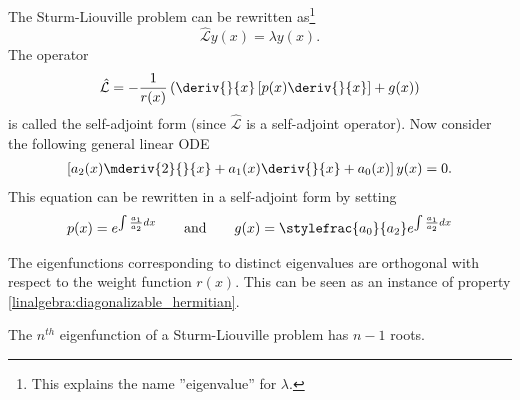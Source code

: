 	\begin{definition}
		The Sturm-Liouville problem can be rewritten as\footnote{This explains the name ''eigenvalue'' for $\lambda$.} \[\hat{\mathcal{L}}y(x) = \lambda y(x).\] The operator
		\begin{gather}
			\hat{\mathcal{L}} = -\frac{1}{r(x)}\left(\deriv{}{x}\left[p(x)\deriv{}{x}\right] + g(x)\right)
		\end{gather}
		is called the self-adjoint form (since $\hat{\mathcal{L}}$ is a self-adjoint operator). Now consider the following general linear ODE
		\begin{gather}
			\left[a_2(x)\mderiv{2}{}{x} + a_1(x)\deriv{}{x} + a_0(x)\right]y(x) = 0.
		\end{gather}
		This equation can be rewritten in a self-adjoint form by setting
		\begin{gather*}
			p(x) = e^{\int\frac{a_1}{a_2}dx}\qquad\text{and}\qquad g(x) = \stylefrac{a_0}{a_2}e^{\int\frac{a_1}{a_2}dx}
		\end{gather*}
	\end{definition}
    
	\begin{property}
		The eigenfunctions corresponding to distinct eigenvalues are orthogonal with respect to the weight function $r(x)$. This can be seen as an instance of property \ref{linalgebra:diagonalizable_hermitian}.
	\end{property}

	\begin{theorem}
		The $n^{th}$ eigenfunction of a Sturm-Liouville problem has $n-1$ roots.
	\end{theorem}
